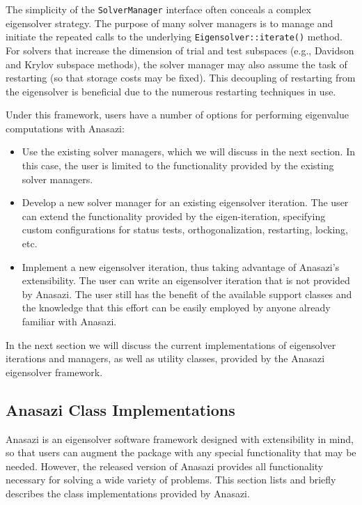 \documentclass[acmtoms]{acmtrans2m}
\newcommand{\aspace}[1]{\texttt{#1}}
\begin{document}
The simplicity of the \aspace{SolverManager} interface often conceals a complex eigensolver strategy.
The purpose of many solver managers is to manage and initiate the repeated calls to the underlying 
\aspace{Eigensolver::iterate()} method. For
solvers that increase the dimension of trial and test subspaces (e.g., Davidson and Krylov
subspace methods), the solver manager may also assume the task of restarting (so that
storage costs may be fixed). This decoupling of restarting from the eigensolver is
beneficial due to the numerous restarting techniques in use.

Under this framework, users have a number of options for performing eigenvalue
computations with Anasazi:
\begin{itemize}
\item
Use the existing solver managers, which we will discuss in the next section. 
In this case, the user is limited to the functionality provided by the existing 
solver managers.
\item
Develop a new solver manager for an existing eigensolver iteration.
The user can extend the functionality provided by the eigen-iteration,
specifying custom configurations for status tests, orthogonalization, restarting, 
locking, etc.
\item
Implement a new eigensolver iteration, thus taking advantage of Anasazi's extensibility. 
The user can write an eigensolver iteration that is not provided by Anasazi. 
The user still has the benefit of the available support classes 
and the knowledge that this effort can be easily employed by anyone already 
familiar with Anasazi.
\end{itemize}
In the next section we will discuss the current implementations of
eigensolver iterations and managers, as well as utility classes, provided
by the Anasazi eigensolver framework.

\subsection{Anasazi Class Implementations}
\label{subsec:anasazi:classes}

Anasazi is an eigensolver software framework designed with extensibility in mind, 
so that users can augment the package with any special functionality that may be
needed. However, the released version of Anasazi provides all
functionality necessary for solving a wide variety of problems. This
section lists and briefly describes the class implementations provided
by Anasazi.
\end{document}
